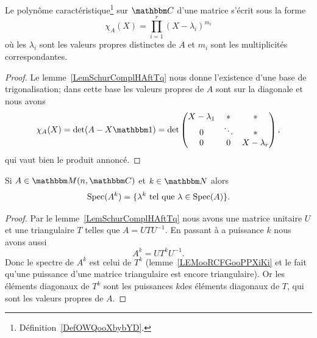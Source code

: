 \begin{corollary}   \label{CorUNZooAZULXT}
    Le polynôme caractéristique\footnote{Définition~\ref{DefOWQooXbybYD}.} sur \( \eC\) d'une matrice s'écrit sous la forme
    \begin{equation}
        \chi_A(X)=\prod_{i=1}^r(X-\lambda_i)^{m_i}
    \end{equation}
    où les \( \lambda_i\) sont les valeurs propres distinctes de \( A\) et \( m_i\) sont les multiplicités correspondantes.
\end{corollary}

\begin{proof}
    Le lemme~\ref{LemSchurComplHAftTq} nous donne l'existence d'une base de trigonalisation; dans cette base les valeurs propres de \( A\) sont sur la diagonale et nous avons
    \begin{equation}
        \chi_A(X)=\det(A-X\mtu)=\det\begin{pmatrix}
            X-\lambda_1    &   *    &   *    \\
            0    &   \ddots    &   *    \\
            0    &   0    &   X-\lambda_r
        \end{pmatrix},
    \end{equation}
    qui vaut bien le produit annoncé.
\end{proof}

\begin{corollary}       \label{CORooTPDHooXazTuZ}
    Si \( A\in \eM(n,\eC)\) et \( k\in \eN\) alors
    \begin{equation}
        \operatorname{Spec}(A^k)=\{ \lambda^k\text{ tel que } \lambda\in \operatorname{Spec}(A) \}.
    \end{equation}
\end{corollary}

\begin{proof}
    Par le lemme~\ref{LemSchurComplHAftTq} nous avons une matrice unitaire \( U\) et une triangulaire \( T\) telles que \( A=UTU^{-1}\). En passant à a puissance \( k\) nous avons aussi
    \begin{equation}
        A^k=UT^kU^{-1}.
    \end{equation}
    Donc le spectre de \( A^k\) est celui de \( T^k\) (lemme~\ref{LEMooRCFGooPPXiKi} et le fait qu'une puissance d'une matrice triangulaire est encore triangulaire). Or les éléments diagonaux de \( T^k\) sont les puissances \( k\)\ieme des éléments diagonaux de \( T\), qui sont les valeurs propres de \( A\).
\end{proof}

